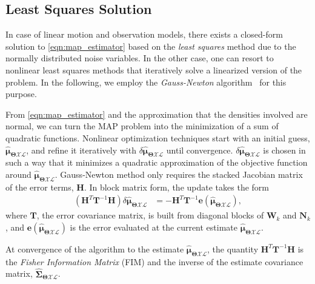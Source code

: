 \subsection{Least Squares Solution}

In case of linear motion and observation models, there exists a closed-form
solution to \eqref{eqn:map_estimator} based on the \emph{least squares} method
due to the normally distributed noise variables. In the other case, one can
resort to nonlinear least squares methods that iteratively solve a linearized
version of the problem. In the following, we employ the \emph{Gauss-Newton}
algorithm~\cite{aster11parameter} for this purpose.

From \eqref{eqn:map_estimator} and the approximation that the densities involved
are normal, we can turn the MAP problem into the minimization of a sum of
quadratic functions. Nonlinear optimization techniques start with an initial
guess,
$\hat{\boldsymbol{\mu}}_{\boldsymbol{\Theta}\mathcal{X}\mathcal{L}}$, and refine
it iteratively with
$\delta\hat{\boldsymbol{\mu}}_{\boldsymbol{\Theta}\mathcal{X}\mathcal{L}}$ until
convergence.
$\delta\hat{\boldsymbol{\mu}}_{\boldsymbol{\Theta}\mathcal{X}\mathcal{L}}$ is
chosen in such a way that it minimizes a quadratic approximation of the
objective function around
$\hat{\boldsymbol{\mu}}_{\boldsymbol{\Theta}\mathcal{X}\mathcal{L}}$.
Gauss-Newton method only requires the stacked Jacobian matrix of the error
terms, $\mathbf{H}$. In block
matrix form, the update takes the form
\begin{equation}\label{eqn:dx_update}
  \begin{aligned}
  (\mathbf{H}^T\mathbf{T}^{-1}\mathbf{H})
    \delta\hat{\boldsymbol{\mu}}_{\boldsymbol{\Theta}\mathcal{X}\mathcal{L}} &=
    -\mathbf{H}^T\mathbf{T}^{-1}\mathbf{e}(\mathbf{\hat{\boldsymbol{\mu}}_{
    \boldsymbol{\Theta}\mathcal{X}\mathcal{L}}}),
  \end{aligned}
\end{equation}
where $\mathbf{T}$, the error covariance matrix, is built from diagonal blocks
of $\mathbf{W}_k$ and $\mathbf{N}_k$, and
$\mathbf{e}(\mathbf{\hat{\boldsymbol{\mu}}_{\boldsymbol{\Theta}\mathcal{X}
\mathcal{L}}})$ is the error evaluated at the current estimate
$\hat{\boldsymbol{\mu}}_{\boldsymbol{\Theta}\mathcal{X}\mathcal{L}}$.

At convergence of the algorithm to the estimate 
$\hat{\boldsymbol{\mu}}_{\boldsymbol{\Theta}\mathcal{X}\mathcal{L}}$, the
quantity $\mathbf{H}^T\mathbf{T}^{-1}\mathbf{H}$ is the
\emph{Fisher Information Matrix} (FIM) and the inverse of the estimate
covariance matrix, $\hat{\boldsymbol{\Sigma}}_{\boldsymbol{\Theta}
\mathcal{X}\mathcal{L}}$.

